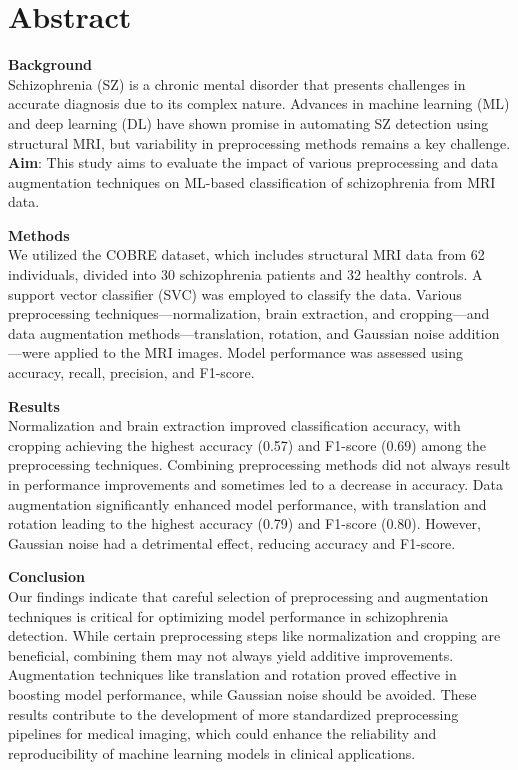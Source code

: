 



\maketitle

\section{Abstract}

\textbf{Background}\\
Schizophrenia (SZ) is a chronic mental disorder that presents challenges in accurate diagnosis due to its complex nature. Advances in machine learning (ML) and deep learning (DL) have shown promise in automating SZ detection using structural MRI, but variability in preprocessing methods remains a key challenge.
\textbf{Aim}: This study aims to evaluate the impact of various preprocessing and data augmentation techniques on ML-based classification of schizophrenia from MRI data.

\textbf{Methods}\\
We utilized the COBRE dataset, which includes structural MRI data from 62 individuals, divided into 30 schizophrenia patients and 32 healthy controls. A support vector classifier (SVC) was employed to classify the data. Various preprocessing techniques—normalization, brain extraction, and cropping—and data augmentation methods—translation, rotation, and Gaussian noise addition—were applied to the MRI images. Model performance was assessed using accuracy, recall, precision, and F1-score.

\textbf{Results}\\
Normalization and brain extraction improved classification accuracy, with cropping achieving the highest accuracy (0.57) and F1-score (0.69) among the preprocessing techniques. Combining preprocessing methods did not always result in performance improvements and sometimes led to a decrease in accuracy. Data augmentation significantly enhanced model performance, with translation and rotation leading to the highest accuracy (0.79) and F1-score (0.80). However, Gaussian noise had a detrimental effect, reducing accuracy and F1-score.

\textbf{Conclusion}\\
Our findings indicate that careful selection of preprocessing and augmentation techniques is critical for optimizing model performance in schizophrenia detection. While certain preprocessing steps like normalization and cropping are beneficial, combining them may not always yield additive improvements. Augmentation techniques like translation and rotation proved effective in boosting model performance, while Gaussian noise should be avoided. These results contribute to the development of more standardized preprocessing pipelines for medical imaging, which could enhance the reliability and reproducibility of machine learning models in clinical applications.

